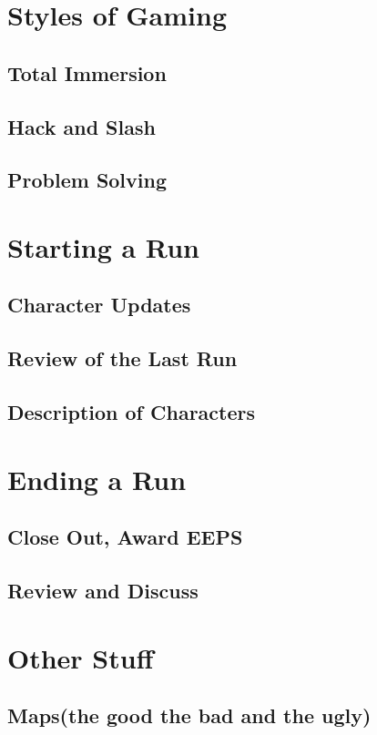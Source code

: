 \section{Styles of Gaming}
	\subsection{Total Immersion}
	\subsection{Hack and Slash}
	\subsection{Problem Solving}

\section{Starting a Run}
	\subsection{Character Updates}
	\subsection{Review of the Last Run}
	\subsection{Description of Characters}

\section{Ending a Run}
	\subsection{Close Out, Award EEPS}	
	\subsection{Review and Discuss}

\section{Other Stuff}
	\subsection{Maps(the good the bad and the ugly)}
